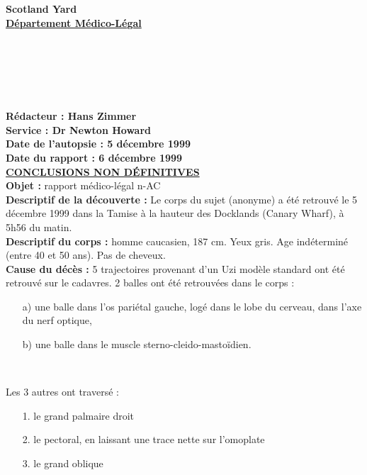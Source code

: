 \documentclass[11pt,twoside,a4paper]{book}
\begin{document}
\clearpage

\pagestyle{empty}

\begin{center}
\textbf{\Huge Scotland Yard}~\\
\textbf{\large \underline{D{\'e}partement M{\'e}dico-L{\'e}gal}}~\\
\end{center}

~\\~\\~\\~\\~\\

\textbf{R{\'e}dacteur : Hans Zimmer}~\\
\textbf{Service : Dr Newton Howard}~\\
\textbf{Date de l'autopsie : 5 d{\'e}cembre 1999}~\\
\textbf{Date du rapport : 6 d{\'e}cembre 1999}~\\

\textbf{\underline{\textsc{CONCLUSIONS NON D{\'E}FINITIVES}}}~\\

\textbf{Objet : }rapport m{\'e}dico-l{\'e}gal n-AC~\\

\textbf{Descriptif de la d{\'e}couverte : }Le corps du sujet (anonyme) a {\'e}t{\'e} retrouv{\'e} le 5 d{\'e}cembre 1999 dans la Tamise {\`a} la hauteur des Docklands (Canary Wharf), {\`a} 5h56 du matin. ~\\

\textbf{Descriptif du corps : }homme caucasien, 187 cm. Yeux gris. Age ind{\'e}termin{\'e} (entre 40 et 50 ans). Pas de cheveux. ~\\

\textbf{Cause du d{\'e}c{\`e}s : }5 trajectoires provenant d'un Uzi mod{\`e}le standard ont {\'e}t{\'e} retrouv{\'e} sur le cadavres. 2 balles ont {\'e}t{\'e} retrouv{\'e}es dans le corps :
\setlength\parindent{20pt}
\begin{itemize}
	\item[a)] une balle dans l'os pari{\'e}tal gauche, log{\'e} dans le lobe du cerveau, dans l'axe du nerf optique,
	\item[b)] une balle dans le muscle sterno-cleido-masto{\"i}dien.
\end{itemize}~\\
\setlength\parindent{0pt}

Les 3 autres ont travers{\'e} :
\setlength\parindent{20pt}
\begin{itemize}
	\item[1.] le grand palmaire droit
	\item[2.] le pectoral, en laissant une trace nette sur l'omoplate
	\item[3.] le grand oblique
\end{itemize}~\\
\setlength\parindent{0pt}
\end{document}

